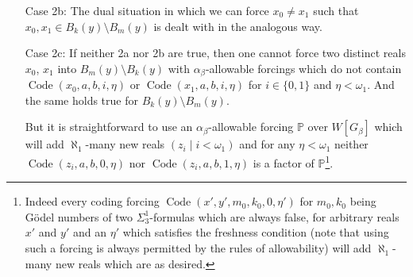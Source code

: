 \documentclass[a4paper,11pt]{article}
\newcommand{\forceP}{\mathbb{P}}
\begin{document}
\begin{enumerate}
\begin{proof}
We split into several cases.
Assume first that in $M \supset W[G_{\beta+1}]$, $x_0,x_1 \in B_m(y)$ still holds true. Then, as $x_0 \in B_0 \setminus B_1$ and $x_1 \in B_1 \setminus B_0$, the set $B_m(y)$ can neither reduce $B_0$ nor $B_1$.  Indeed $x_0$ witnesses that $B_m (y) $ is not a subset of $B_1$ and $x_1$ witnesses that $B_m(y)$ is not a subset of $B_0$.  If, in a further $\alpha_{\beta}+1$-allowable extension of $M \supset W[G_{\beta+1}]$, $x_0 \notin B_m(y)$ or $x_1 \notin B_m(y)$ then this will be dealt with in the next subcases.

If in $M \supset W[G_{\beta+1}]$, $x_0 \notin B_m(y)$, yet $x_1 \in B_m(y)$ then $x_0 \notin B_m(y) \cup B_k(y)$ and $x_0 \in B_0$ in all $\alpha_{\beta}+1$-allowable generic extensions of $M$. So $B_m(y) \cup B_k(y) \ne B_0 \cup B_1$ and $B_m(y), B_k(y)$ can not reduce $B_0, B_1$. The same argument works if $x_1 \notin B_m(y)$ and $x_0 \in B_m(y)$.

If in $M$, $x_0, x_1 \notin B_m(y)$ anymore, then again $B_m(y),B_k(y)$ can not reduce $B_0,B_1$.

\end{proof}

\item[Case 2b:] The dual situation in which we can force $x_0 \ne x_1$ such that $x_0, x_1 \in B_k(y) \setminus B_m(y)$ is dealt with in the analogous way.

\item[Case 2c:] If neither 2a nor 2b are true, then one cannot force two distinct reals $x_0$, $x_1$ into $B_m(y) \setminus B_k(y)$ with $\alpha_{\beta}$-allowable forcings which do not contain $\operatorname{Code} (x_0,a,b,i,\eta)$ or $\operatorname{Code} (x_1,a,b,i,\eta)$ for $i \in \{0,1\}$ and $\eta <\omega_1$. And the same holds true for $B_k(y) \setminus B_m(y)$. 

But it is straightforward to use an $\alpha_{\beta}$-allowable forcing $\forceP$ over $W[G_{\beta}]$ which will add $\aleph_1$-many new reals $(z_i \mid i < \omega_1)$ and for any $\eta <\omega_1$ neither $\operatorname{Code} (z_i,a,b,0,\eta)$ nor $\operatorname{Code} (z_i,a,b,1,\eta)$ is a factor of $\forceP$\footnote{Indeed every coding forcing $\operatorname{Code}(x',y',m_0,k_0,0,\eta')$ for $m_0,k_0$ being G\"odel numbers of two $\Sigma^1_3$-formulas which are always false, for arbitrary reals $x'$ and $y'$ and an $\eta'$ which satisfies the freshness condition (note that using such a forcing is always permitted by the rules of allowability) will add $\aleph_1$-many new reals which are as desired.}.
    

\end{enumerate}
\end{document}
